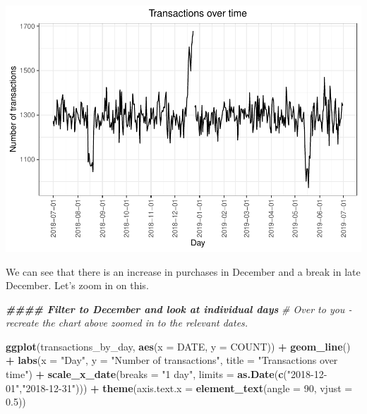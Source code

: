 \documentclass[
]{article}
\newenvironment{Shaded}{\begin{snugshade}}{\end{snugshade}}
\newcommand{\AttributeTok}[1]{\textcolor[rgb]{0.13,0.29,0.53}{#1}}
\newcommand{\CommentTok}[1]{\textcolor[rgb]{0.56,0.35,0.01}{\textit{#1}}}
\newcommand{\DecValTok}[1]{\textcolor[rgb]{0.00,0.00,0.81}{#1}}
\newcommand{\DocumentationTok}[1]{\textcolor[rgb]{0.56,0.35,0.01}{\textbf{\textit{#1}}}}
\newcommand{\FloatTok}[1]{\textcolor[rgb]{0.00,0.00,0.81}{#1}}
\newcommand{\FunctionTok}[1]{\textcolor[rgb]{0.13,0.29,0.53}{\textbf{#1}}}
\newcommand{\NormalTok}[1]{#1}
\newcommand{\SpecialCharTok}[1]{\textcolor[rgb]{0.81,0.36,0.00}{\textbf{#1}}}
\newcommand{\StringTok}[1]{\textcolor[rgb]{0.31,0.60,0.02}{#1}}
\begin{document}
\begin{center}\includegraphics{template_files/figure-latex/unnamed-chunk-7-1} \end{center}

We can see that there is an increase in purchases in December and a
break in late December. Let's zoom in on this.

\begin{Shaded}
\begin{Highlighting}[]
\DocumentationTok{\#\#\#\# Filter to December and look at individual days}
\CommentTok{\# Over to you {-} recreate the chart above zoomed in to the relevant dates.}

\FunctionTok{ggplot}\NormalTok{(transactions\_by\_day, }\FunctionTok{aes}\NormalTok{(}\AttributeTok{x =}\NormalTok{ DATE, }\AttributeTok{y =}\NormalTok{ COUNT)) }\SpecialCharTok{+}
 \FunctionTok{geom\_line}\NormalTok{() }\SpecialCharTok{+}
 \FunctionTok{labs}\NormalTok{(}\AttributeTok{x =} \StringTok{"Day"}\NormalTok{, }\AttributeTok{y =} \StringTok{"Number of transactions"}\NormalTok{, }\AttributeTok{title =} \StringTok{"Transactions over time"}\NormalTok{) }\SpecialCharTok{+}
 \FunctionTok{scale\_x\_date}\NormalTok{(}\AttributeTok{breaks =} \StringTok{"1 day"}\NormalTok{, }\AttributeTok{limits =} \FunctionTok{as.Date}\NormalTok{(}\FunctionTok{c}\NormalTok{(}\StringTok{"2018{-}12{-}01"}\NormalTok{,}\StringTok{"2018{-}12{-}31"}\NormalTok{))) }\SpecialCharTok{+}
 \FunctionTok{theme}\NormalTok{(}\AttributeTok{axis.text.x =} \FunctionTok{element\_text}\NormalTok{(}\AttributeTok{angle =} \DecValTok{90}\NormalTok{, }\AttributeTok{vjust =} \FloatTok{0.5}\NormalTok{))}
\end{Highlighting}
\end{Shaded}
\end{document}
